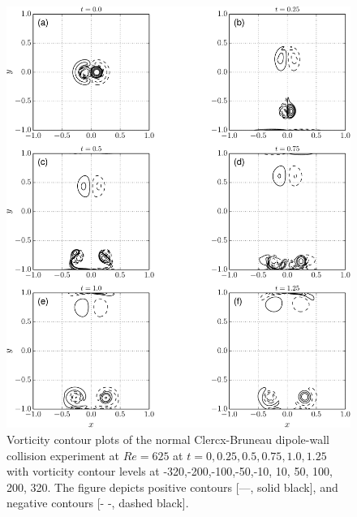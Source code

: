 	\begin{figure}[p]
	\centering
	\includegraphics[width=\linewidth]{./figures/eulerian/dipole_contourLine_portrait-crop.pdf}
	\caption{Vorticity contour plots of the normal Clercx-Bruneau dipole-wall collision experiment at $Re=625$ at $t = 0, 0.25, 0.5, 0.75, 1.0, 1.25$ with vorticity contour levels at -320,-200,-100,-50,-10, 10, 50, 100, 200, 320. The figure depicts positive contours [---, solid black], and negative contours [- -, dashed black].}
	\label{fig:dipole_contourLine_portrait}
	\end{figure}
	
